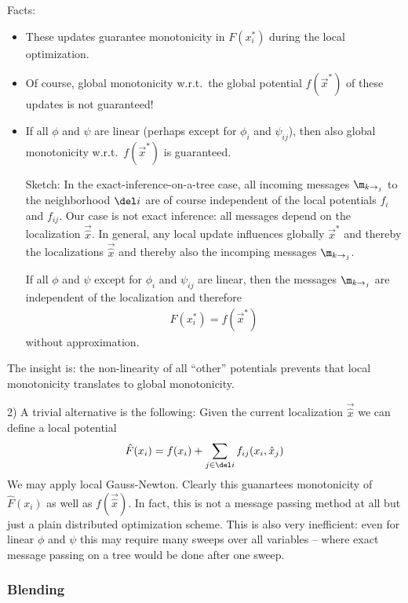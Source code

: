 Facts:
\begin{itemize}
\item These updates guarantee monotonicity in $F(x_i^*)$ during the local
optimization.

\item Of course, global monotonicity w.r.t.\ the global potential
$f(\vec x^*)$ of these updates is not guaranteed!

\item If all $\phi$ and $\psi$ are linear (perhaps except for $\phi_i$ and
$\psi_{ij}$), then also global monotonicity w.r.t.\ $f(\vec x^*)$ is guaranteed.

Sketch: In the exact-inference-on-a-tree case, all incoming messages
$\m_{k\to_j}$ to the neighborhood $\del i$ are of course independent
of the local potentials $f_i$ and $f_{ij}$. Our case is not exact
inference: all messages depend on the localization $\vec{\hat x}$. In
general, any local update influences globally $\vec x^*$ and thereby
the localizations $\vec{\hat x}$ and thereby also the incomping messages
$\m_{k\to_j}$.

If all $\phi$ and $\psi$  except for $\phi_i$ and
$\psi_{ij}$ are linear, then the messages $\m_{k\to_j}$ are independent of the
localization and therefore
\begin{align}
F(x_i^*) = f(\vec x^*)
\end{align}
without approximation.
\end{itemize}

The insight is: the non-linearity of all ``other'' potentials prevents
that local monotonicity translates to global monotonicity.

2) A trivial alternative is the following: Given the current
localization $\vec{\hat x}$ we can define a local potential
\begin{align}
\hat F(x_i) = f(x_i) + \sum_{j\in\del i} f_{ij}(x_i,\hat x_j)
\end{align}
We may apply local Gauss-Newton. Clearly this guanartees monotonicity
of $\hat F(x_i)$ as well as $f(\vec{\hat x})$. In fact, this is not a
message passing method at all but just a plain distributed
optimization scheme. This is also very inefficient: even for linear
$\phi$ and $\psi$ this may require many sweeps over all variables --
where exact message passing on a tree would be done after one sweep.

\subsubsection{Blending}

